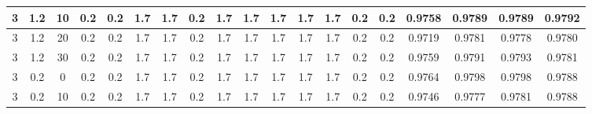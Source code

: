 \documentclass{ieeeaccess}
\begin{document}
\begin{table*}
{\begin{tabular}{|c|c|c|c|c|c|c|c|c|c|c|c|c|c|c|c|c|c|c|}
\hline
3 & 1.2                   & 10     & 0.2                     & 0.2                     & 1.7                     & 1.7                     & 0.2                     & 1.7                     & 1.7                     & 1.7                     & 1.7                     & 1.7                     & 0.2                     & 0.2 & 0.9758                                     & 0.9789                                     & 0.9789                                     & 0.9792                                      \\ 
\hline
3 & 1.2                   & 20     & 0.2                     & 0.2                     & 1.7                     & 1.7                     & 0.2                     & 1.7                     & 1.7                     & 1.7                     & 1.7                     & 1.7                     & 0.2                     & 0.2 & 0.9719                                     & 0.9781                                     & 0.9778                                     & 0.9780                                      \\ 
\hline
3 & 1.2                   & 30     & 0.2                     & 0.2                     & 1.7                     & 1.7                     & 0.2                     & 1.7                     & 1.7                     & 1.7                     & 1.7                     & 1.7                     & 0.2                     & 0.2 & 0.9759                                     & 0.9791                                     & 0.9793                                     & 0.9781                                      \\ 
\hline
3 & 0.2                   & 0      & 0.2                     & 0.2                     & 1.7                     & 1.7                     & 0.2                     & 1.7                     & 1.7                     & 1.7                     & 1.7                     & 1.7                     & 0.2                     & 0.2 & \textcolor[rgb]{0.122,0.122,0.129}{0.9764} & \textcolor[rgb]{0.122,0.122,0.129}{0.9798} & \textcolor[rgb]{0.122,0.122,0.129}{0.9798} & \textcolor[rgb]{0.122,0.122,0.129}{0.9788}  \\ 
\hline
3 & 0.2                   & 10     & 0.2                     & 0.2                     & 1.7                     & 1.7                     & 0.2                     & 1.7                     & 1.7                     & 1.7                     & 1.7                     & 1.7                     & 0.2                     & 0.2 & \textcolor[rgb]{0.122,0.122,0.129}{0.9746} & \textcolor[rgb]{0.122,0.122,0.129}{0.9777} & \textcolor[rgb]{0.122,0.122,0.129}{0.9781} & \textcolor[rgb]{0.122,0.122,0.129}{0.9788}  \\ 

\end{tabular}}
\end{table*}
\end{document}
